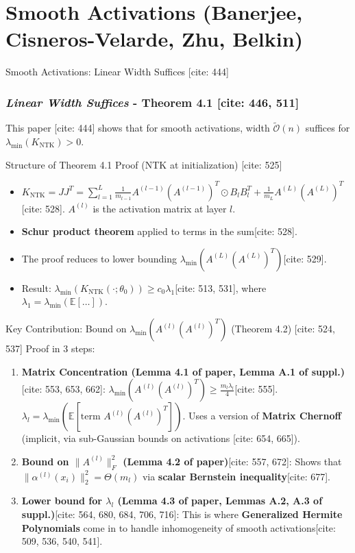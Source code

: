 \documentclass{beamer}
\theoremstyle{definition}
\theoremstyle{remark}
\newcommand{\E}{\mathbb{E}}
\newcommand{\KNTK}{K_{\text{NTK}}}
\newcommand{\lambdaMin}{\lambda_{\min}}
\newcommand{\TildeOrder}{\tilde{\mathcal{O}}}
\begin{document}
\section{Smooth Activations (Banerjee, Cisneros-Velarde, Zhu, Belkin)}
\begin{frame}{Smooth Activations: Linear Width Suffices [cite: 444]}
  \frametitle{\textit{Linear Width Suffices} - Theorem 4.1 [cite: 446, 511]}
   \justify
  This paper [cite: 444] shows that for smooth activations, width $\TildeOrder(n)$ suffices for $\lambdaMin(\KNTK) > 0$.

  \begin{block}{Structure of Theorem 4.1 Proof (NTK at initialization) [cite: 525]}
    \begin{itemize}
      \item $\KNTK = JJ^T = \sum_{l=1}^{L} \frac{1}{m_{l-1}}A^{(l-1)}(A^{(l-1)})^T \odot B_l B_l^T + \frac{1}{m_L}A^{(L)}(A^{(L)})^T$[cite: 528]. $A^{(l)}$ is the activation matrix at layer $l$.
      \item \textbf{Schur product theorem} applied to terms in the sum[cite: 528].
      \item The proof reduces to lower bounding $\lambdaMin(A^{(L)}(A^{(L)})^T)$[cite: 529].
      \item Result: $\lambdaMin(\KNTK(\cdot;\theta_0)) \ge c_0 \lambda_1$[cite: 513, 531], where $\lambda_1 = \lambdaMin(\E[\dots])$.
    \end{itemize}
  \end{block}
  \pause
  \begin{block}{Key Contribution: Bound on $\lambdaMin(A^{(l)}(A^{(l)})^T)$ (Theorem 4.2) [cite: 524, 537]}
    Proof in 3 steps:
    \begin{enumerate}
      \item \textbf{Matrix Concentration (Lemma 4.1 of paper, Lemma A.1 of suppl.)}[cite: 553, 653, 662]:
      $\lambdaMin(A^{(l)}(A^{(l)})^T) \ge \frac{m_l \lambda_l}{4}$[cite: 555]. $\lambda_l = \lambdaMin(\E[\text{term } A^{(l)}(A^{(l)})^T])$.
      Uses a version of \textbf{Matrix Chernoff} (implicit, via sub-Gaussian bounds on activations [cite: 654, 665]).
      \item \textbf{Bound on $\|A^{(l)}\|_F^2$ (Lemma 4.2 of paper)}[cite: 557, 672]: Shows that $\|\alpha^{(l)}(x_i)\|_2^2 = \Theta(m_l)$ via \textbf{scalar Bernstein inequality}[cite: 677].
      \item \textbf{Lower bound for $\lambda_l$ (Lemma 4.3 of paper, Lemmas A.2, A.3 of suppl.)}[cite: 564, 680, 684, 706, 716]: This is where \textbf{Generalized Hermite Polynomials} come in to handle inhomogeneity of smooth activations[cite: 509, 536, 540, 541].

\end{enumerate}
\end{block}
\end{frame}
\end{document}

